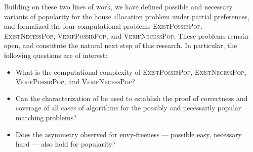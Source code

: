 \documentclass{article}
\begin{document}
Building on these two lines of work, we have defined possible and necessary variants of popularity for the house allocation problem under partial preferences, and formalized the four computational problems \textsc{ExistPossibPop}, \textsc{ExistNecessPop}, \textsc{VerifPossibPop}, and \textsc{VerifNecessPop}. 
These problems remain open, and constitute the natural next step of this research. 
In particular, the following questions are of interest:
\begin{itemize}
    \item What is the computational complexity of \textsc{ExistPossibPop}, \textsc{ExistNecessPop}, \textsc{VerifPossibPop}, and \textsc{VerifNecessPop}?
    \item Can the characterization of \cite{abraham2007popular} be used to establish the proof of correctness and coverage of all cases of algorithms for the possibly and necessarily popular matching problems?
    \item Does the asymmetry observed for envy-freeness --- possible easy, necessary hard --- also hold for popularity?
\end{itemize}



\end{document}
